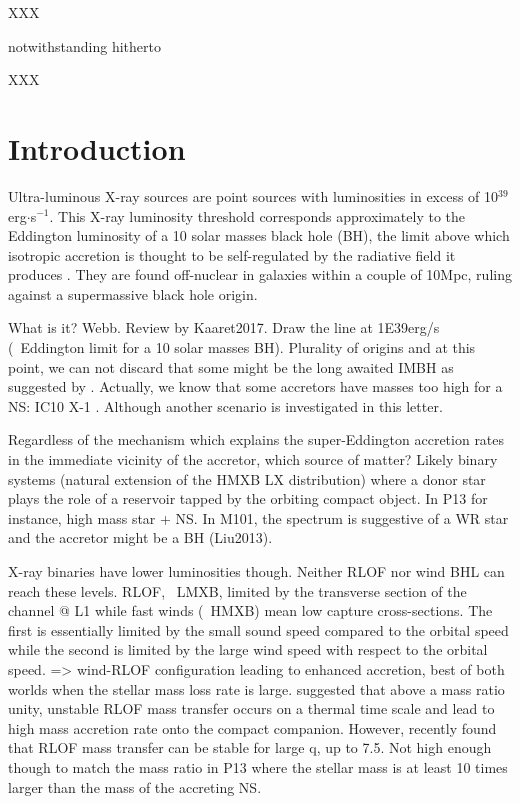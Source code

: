 \documentclass[letter]{aa}
\makeatletter
\newcommand*{\ns}{NS\@\xspace}
\newcommand*{\bh}{BH\@\xspace}
\makeatother
\begin{document}

   \maketitle
%

XXX

notwithstanding
hitherto

XXX

\section{Introduction}


Ultra-luminous X-ray sources are point sources with luminosities in excess of 10$^{39}$erg$\cdot$s$^{-1}$. This X-ray luminosity threshold corresponds approximately to the Eddington luminosity of a 10 solar masses black hole (\bh), the limit above which isotropic accretion is thought to be self-regulated by the radiative field it produces \citep{Rappaport2005}. They are found off-nuclear in galaxies within a couple of 10Mpc, ruling against a supermassive black hole origin.

What is it? Webb. Review by Kaaret2017. Draw the line at 1E39erg/s (~Eddington limit for a 10 solar masses BH). Plurality of origins and at this point, we can not discard that some might be the long awaited IMBH as suggested by \cite{Colbert1999}. Actually, we know that some accretors have masses too high for a \ns : IC10 X-1 \citep{Prestwich2007,Silverman2008}. Although another scenario is investigated in this letter.

Regardless of the mechanism which explains the super-Eddington accretion rates in the immediate vicinity of the accretor, which source of matter? Likely binary systems (natural extension of the HMXB LX distribution) where a donor star plays the role of a reservoir tapped by the orbiting compact object. In P13 for instance, high mass star + NS. In M101, the spectrum is suggestive of a WR star and the accretor might be a BH (Liu2013).

X-ray binaries have lower luminosities though. Neither RLOF nor wind BHL can reach these levels. RLOF, ~LMXB, limited by the transverse section of the channel @ L1 while fast winds (~HMXB) mean low capture cross-sections. The first is essentially limited by the small sound speed compared to the orbital speed while the second is limited by the large wind speed with respect to the orbital speed. => wind-RLOF configuration leading to enhanced accretion, best of both worlds when the stellar mass loss rate is large. \cite{King2002} suggested that above a mass ratio unity, unstable RLOF mass transfer occurs on a thermal time scale and lead to high mass accretion rate onto the compact companion. However, \cite{Pavlovskii2017} recently found that RLOF mass transfer can be stable for large q, up to 7.5. Not high enough though to match the mass ratio in P13 where the stellar mass is at least 10 times larger than the mass of the accreting \ns.
\end{document}
